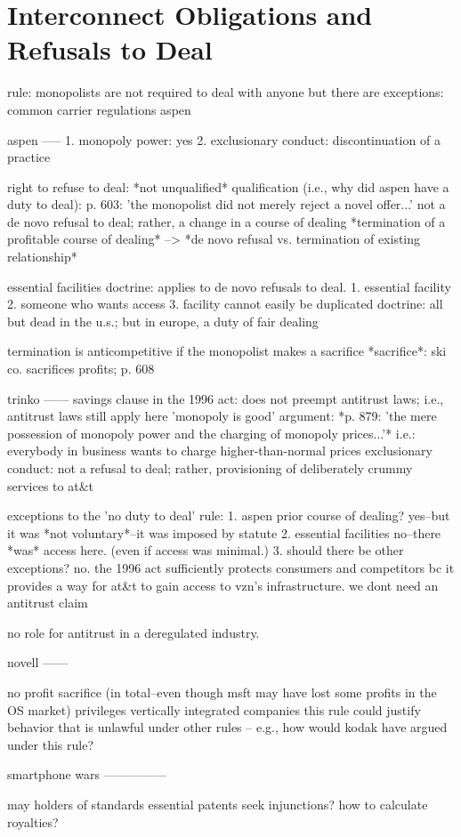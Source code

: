 \section{Interconnect Obligations and Refusals to Deal}

rule: monopolists are not required to deal with anyone
    but there are exceptions:
        common carrier regulations
        aspen

aspen
-----
    1. monopoly power: yes
    2. exclusionary conduct: discontinuation of a practice

    right to refuse to deal: *not unqualified*
        qualification (i.e., why did aspen have a duty to deal): p. 603: 'the monopolist did not merely reject a novel offer...'
            not a de novo refusal to deal; rather, a change in a course of dealing
            *termination of a profitable course of dealing*
            --> *de novo refusal vs. termination of existing relationship*

    essential facilities doctrine:
        applies to de novo refusals to deal.
        1. essential facility
        2. someone who wants access
        3. facility cannot easily be duplicated
        doctrine: all but dead in the u.s.; but in europe, a duty of fair dealing

    termination is anticompetitive if the monopolist makes a sacrifice
        *sacrifice*: ski co. sacrifices profits; p. 608 

trinko
------
    savings clause in the 1996 act: does not preempt antitrust laws; i.e., antitrust laws still apply here
    'monopoly is good' argument: *p. 879: 'the mere possession of monopoly power and the charging of monopoly prices...'*
        i.e.: everybody in business wants to charge higher-than-normal prices
    exclusionary conduct: not a refusal to deal; rather, provisioning of deliberately crummy services to at\&t

    exceptions to the 'no duty to deal' rule:
        1. aspen
            prior course of dealing? yes--but it was *not voluntary*--it was imposed by statute
        2. essential facilities
            no--there *was* access here. (even if access was minimal.)
        3. should there be other exceptions?
            no.
            the 1996 act sufficiently protects consumers and competitors bc it provides a way for at\&t to gain access to vzn's infrastructure. we dont need an antitrust claim

    no role for antitrust in a deregulated industry.

novell
------

no profit sacrifice (in total--even though msft may have lost some profits in the OS market)
    privileges vertically integrated companies
    this rule could justify behavior that is unlawful under other rules -- e.g., how would kodak have argued under this rule? 

smartphone wars
---------------

may holders of standards essential patents seek injunctions?
how to calculate royalties?
